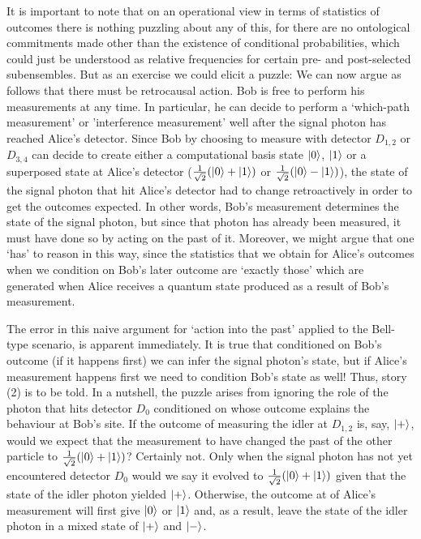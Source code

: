 \documentclass[11pt]{article}
\numberwithin{equation}{section}
\begin{document}
It is important to note that on an operational view in terms of statistics of outcomes there is nothing puzzling about any of this, for there are no ontological commitments made other than the existence of conditional probabilities, which could just be understood as relative frequencies for certain pre- and post-selected subensembles. But as an exercise we could elicit a puzzle: We can now argue as follows that there must be retrocausal action. Bob is free to perform his measurements at any time. In particular, he can decide to perform a `which-path measurement' or 'interference measurement' well after the signal photon has reached Alice's detector. Since Bob by choosing to measure with detector $D_{1,2}$ or $D_{3,4}$ can decide to create either a computational basis state $\ket{0}$, $\ket{1}$ or a superposed state at Alice's detector ($\frac{1}{\sqrt{2}}(\ket{0}+\ket{1})$ or $\frac{1}{\sqrt{2}}(\ket{0}-\ket{1})$), the state of the signal photon that hit Alice's detector had to change retroactively in order to get the outcomes expected. In other words, Bob's measurement determines the state of the signal photon, but since that photon has already been measured, it must have done so by acting on the past of it. Moreover, we might argue that one `has' to reason in this way, since the statistics that we obtain for Alice's outcomes when we condition on Bob's later outcome are `exactly those' which are generated when Alice receives a quantum state produced as a result of Bob's measurement.

The error in this naive argument for `action into the past' applied to the Bell-type scenario, is apparent immediately. It is true that conditioned on Bob's outcome (if it happens first) we can infer the signal photon's state, but if Alice's measurement happens first we need to condition Bob's state as well! Thus, story (2) is to be told. In a nutshell, the puzzle arises from ignoring the role of the photon that hits detector $D_0$ conditioned on whose outcome explains the behaviour at Bob's site. If the outcome of measuring the idler at $D_{1,2}$ is, say, $\ket{+}$, would we expect that the measurement to have changed the past of the other particle to $\frac{1}{\sqrt{2}}(\ket{0}+\ket{1})$? Certainly not. Only when the signal photon has not yet encountered detector $D_0$ would we say it evolved to $\frac{1}{\sqrt{2}}(\ket{0}+\ket{1})$ given that the state of the idler photon yielded $\ket{+}$. Otherwise, the outcome at of Alice's measurement will first give $\ket{0}$ or $\ket{1}$ and, as a result, leave the state of the idler photon in a mixed state of $\ket{+}$ and $\ket{-}$.
\end{document}
